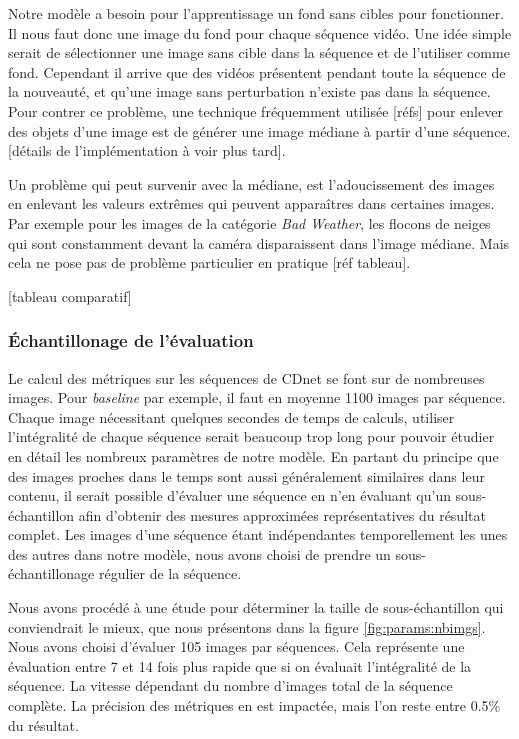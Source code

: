 	Notre modèle a besoin pour l'apprentissage un fond sans cibles pour fonctionner. Il nous faut donc une image du fond pour chaque séquence vidéo. Une idée simple serait de sélectionner une image sans cible dans la séquence et de l'utiliser comme fond. Cependant il arrive que des vidéos présentent pendant toute la séquence de la nouveauté, et qu'une image sans perturbation n'existe pas dans la séquence. Pour contrer ce problème, une technique fréquemment utilisée [réfs] pour enlever des objets d'une image est de générer une image médiane à partir d'une séquence. [détails de l'implémentation à voir plus tard].

	Un problème qui peut survenir avec la médiane, est l'adoucissement des images en enlevant les valeurs extrêmes qui peuvent apparaîtres dans certaines images. Par exemple pour les images de la catégorie \textit{Bad Weather}, les flocons de neiges qui sont constamment devant la caméra disparaissent dans l'image médiane. Mais cela ne pose pas de problème particulier en pratique [réf tableau].

	[tableau comparatif]
	
	\subsubsection{Échantillonage de l'évaluation}

	Le calcul des métriques sur les séquences de CDnet se font sur de nombreuses images. Pour \textit{baseline} par exemple, il faut en moyenne 1100 images par séquence. Chaque image nécessitant quelques secondes de temps de calculs, utiliser l'intégralité de chaque séquence serait beaucoup trop long pour pouvoir étudier en détail les nombreux paramètres de notre modèle. En partant du principe que des images proches dans le temps sont aussi généralement similaires dans leur contenu, il serait possible d'évaluer une séquence en n'en évaluant qu'un sous-échantillon afin d'obtenir des mesures approximées représentatives du résultat complet. Les images d'une séquence étant indépendantes temporellement les unes des autres dans notre modèle, nous avons choisi de prendre un sous-échantillonage régulier de la séquence.
	
	Nous avons procédé à une étude pour déterminer la taille de sous-échantillon qui conviendrait le mieux, que nous présentons dans la figure \ref{fig:params:nbimgs}. Nous avons choisi d'évaluer 105 images par séquences. Cela représente une évaluation entre 7 et 14 fois plus rapide que si on évaluait l'intégralité de la séquence. La vitesse dépendant du nombre d'images total de la séquence complète. La précision des métriques en est impactée, mais l'on reste entre 0.5\% du résultat.


